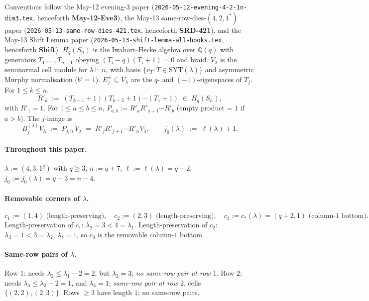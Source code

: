 \documentclass[11pt]{article}
\theoremstyle{definition}
\begin{document}
Conventions follow the May-12 evening-3 paper
(\texttt{2026-05-12-evening-4-2-1n-dim3.tex}, henceforth
\textbf{May-12-Eve3}), the May-13 same-row-dies-$(4,2,1^*)$ paper
(\texttt{2026-05-13-same-row-dies-421.tex}, henceforth
\textbf{SRD-421}), and the May-13 Shift Lemma paper
(\texttt{2026-05-13-shift-lemma-all-hooks.tex}, henceforth
\textbf{Shift}). $H_q(S_n)$ is the Iwahori--Hecke algebra over
$\mathbb{Q}(q)$ with generators $T_1, \ldots, T_{n-1}$ obeying
$(T_i - q)(T_i + 1) = 0$ and braid. $V_\lambda$ is the seminormal
cell module for $\lambda \vdash n$, with basis $\{v_T : T \in
\mathrm{SYT}(\lambda)\}$ and asymmetric Murphy normalisation ($b' = 1$).
$E_j^\pm \subseteq V_\lambda$ are the $q$- and $(-1)$-eigenspaces of
$T_j$. For $1 \le k \le n$,
\[
   R'_k \;:=\; (T_{k-1}{+}1)(T_{k-2}{+}1)\cdots(T_1{+}1)
   \;\in\; H_q(S_n),
\]
with $R'_1 = 1$. For $1 \le a \le b \le n$, $P_{a, b} := R'_a R'_{a+1}
\cdots R'_b$ (empty product = $1$ if $a > b$). The $j$-image is
\[
   B^{(\lambda)}_j V_\lambda \;:=\; P_{j, n}\, V_\lambda
   \;=\; R'_j R'_{j+1}\cdots R'_n V_\lambda,
   \qquad
   j_0(\lambda) \;:=\; \ell(\lambda) + 1.
\]

\paragraph{Throughout this paper.}
$\lambda := (4, 3, 1^q)$ with $q \ge 3$, $n := q + 7$, $\ell :=
\ell(\lambda) = q + 2$, $j_0 := j_0(\lambda) = q + 3 = n - 4$.

\paragraph{Removable corners of $\lambda$.}
\[
   c_1 := (1, 4) \text{ (length-preserving)},
   \quad
   c_2 := (2, 3) \text{ (length-preserving)},
   \quad
   c_3 := c_*(\lambda) = (q+2, 1) \text{ (column-$1$ bottom)}.
\]
Length-preservation of $c_1$: $\lambda_2 = 3 < 4 = \lambda_1$.
Length-preservation of $c_2$: $\lambda_3 = 1 < 3 = \lambda_2$.
$\lambda_\ell = 1$, so $c_3$ is the removable column-$1$ bottom.

\paragraph{Same-row pairs of $\lambda$.}
Row $1$: needs $\lambda_2 \le \lambda_1 - 2 = 2$, but $\lambda_2 = 3$;
\emph{no same-row pair at row $1$}.
Row $2$: needs $\lambda_3 \le \lambda_2 - 2 = 1$, and $\lambda_3 = 1$;
\emph{same-row pair at row $2$}, cells $\{(2, 2), (2, 3)\}$.
Rows $\ge 3$ have length $1$; no same-row pairs.
\end{document}
